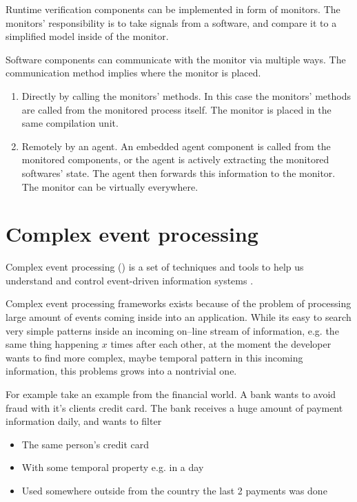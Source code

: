 Runtime verification components can be implemented in form of monitors. The monitors' responsibility is to take signals from a software, and compare it to a simplified model inside of the monitor.

Software components can communicate with the monitor via multiple ways. The communication method implies where the monitor is placed.
\begin{enumerate}
	\item Directly by calling the monitors' methods. In this case the monitors' methods are called from the monitored process itself. The monitor is placed in the same compilation unit.
	      \item\label{item:agent} Remotely by an agent. An embedded agent component is called from the monitored components, or the agent is actively extracting the monitored softwares' state. The agent then forwards this information to the monitor. The monitor can be virtually everywhere.
\end{enumerate}

\section{Complex event processing}

Complex event processing (\cep) is a set of techniques and tools to help us understand and control event-driven information systems \citep{Luckham:2001:PEI:515781}.

Complex event processing frameworks exists because of the problem of processing large amount of events coming inside into an application. While its easy to search  very simple patterns inside an incoming on--line stream of information, e.g. the same thing happening $x$ times after each other, at the moment the developer wants to find more complex, maybe temporal pattern in this incoming information, this problems grows into a nontrivial one.

For example take an example from the financial world. A bank wants to avoid fraud with it's clients credit card. The bank receives a huge amount of payment information daily, and wants to filter
\begin{itemize}
	\item The same person's credit card
	\item With some temporal property e.g. in a day
	\item Used somewhere outside from the country the last 2 payments was done
\end{itemize}

